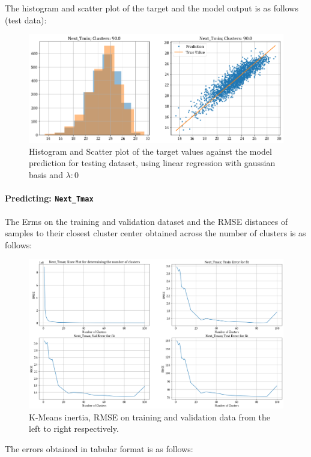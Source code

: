 \documentclass[12pt,a4paper]{article}
\newcommand{\noi}{\noindent}
\def\tt#1{\texttt{#1}}
\begin{document}
\noi
The histogram and scatter plot of the target and the model output is as follows (test data):
\begin{figure}[H]
    \centering
    \includegraphics[scale=0.49]{images/t3_d3/no_reg/T_min_test.png}
    \caption{Histogram and Scatter plot of the target values against the model prediction for testing dataset, using linear regression with gaussian basis and $\lambda: 0$}
\end{figure}

\paragraph{Predicting: \tt{Next\_Tmax}}
The Erms on the training and validation dataset and the RMSE distances of samples to their closest cluster center obtained across the number of clusters is as follows:
\begin{figure}[H]
     \centering
     \includegraphics[scale=0.4]{images/t3_d3/no_reg/tmax_errors.png}
     \caption{K-Means inertia, RMSE on training and validation data from the left to right respectively.}
\end{figure}

\vspace{-1em}
The errors obtained in tabular format is as follows:

\end{document}

